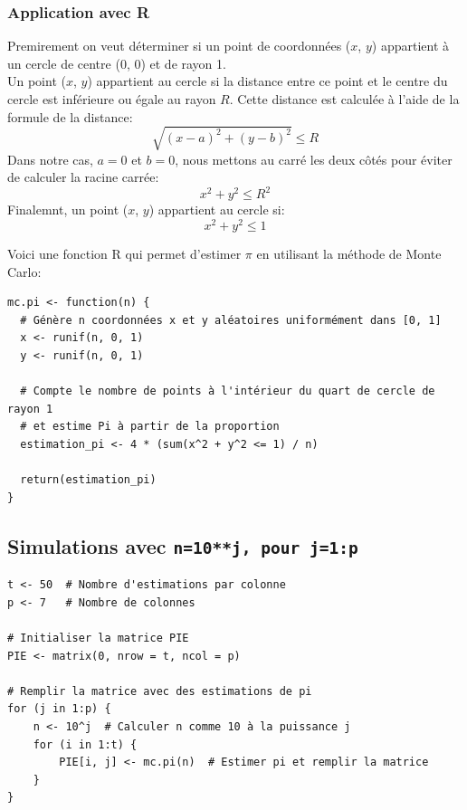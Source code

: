 \documentclass[a4paper,12pt]{article}
\begin{document}
\subsubsection{Application avec R}

Premirement on veut déterminer si un point de coordonnées ($x$, $y$) appartient à un cercle de centre (0, 0) et de rayon 1.
\\[1\baselineskip]
Un point ($x$, $y$) appartient au cercle si la distance entre ce point et le centre du cercle est inférieure ou égale au rayon $R$. Cette distance est calculée à l'aide de la formule de la distance:
\[
\sqrt{(x - a)^2 + (y - b)^2} \leq R
\]
Dans notre cas, $a = 0$ et $b = 0$, nous mettons au carré les deux côtés pour éviter de calculer la racine carrée:
\[
x^2 + y^2 \leq R^2
\]
Finalemnt, un point ($x$, $y$) appartient au cercle si:
\[
x^2 + y^2 \leq 1
\]

\newpage

Voici une fonction R qui permet d'estimer $\pi$ en utilisant la méthode de Monte Carlo:

\begin{lstlisting}
mc.pi <- function(n) {
  # Génère n coordonnées x et y aléatoires uniformément dans [0, 1]
  x <- runif(n, 0, 1)
  y <- runif(n, 0, 1)
  
  # Compte le nombre de points à l'intérieur du quart de cercle de rayon 1
  # et estime Pi à partir de la proportion
  estimation_pi <- 4 * (sum(x^2 + y^2 <= 1) / n)
  
  return(estimation_pi) 
}
\end{lstlisting}

\subsection{Simulations avec \texttt{n=10**j, pour j=1:p} }


\begin{lstlisting}
t <- 50  # Nombre d'estimations par colonne
p <- 7   # Nombre de colonnes

# Initialiser la matrice PIE
PIE <- matrix(0, nrow = t, ncol = p)

# Remplir la matrice avec des estimations de pi
for (j in 1:p) {
    n <- 10^j  # Calculer n comme 10 à la puissance j
    for (i in 1:t) {
        PIE[i, j] <- mc.pi(n)  # Estimer pi et remplir la matrice
    }
}
  \end{lstlisting}
\end{document}
